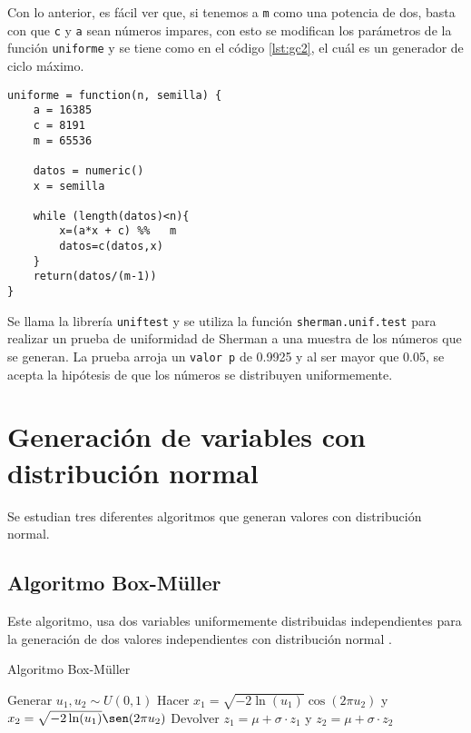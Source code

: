 \documentclass[12pt,letterpaper]{article}
\begin{document}
Con lo anterior, es fácil ver que, si tenemos a \texttt{m} como una potencia de dos, basta con que \texttt{c} y \texttt{a} sean números impares, con esto se modifican los parámetros de la función \texttt{uniforme} y se tiene como en el código \ref{lst:gc2}, el cuál es un generador de ciclo máximo.
\begin{lstlisting}[label=lst:gc2,caption=Generador congruencial., frame = single]
uniforme = function(n, semilla) {
    a = 16385
    c = 8191
    m = 65536
    
    datos = numeric()
    x = semilla
    
    while (length(datos)<n){
        x=(a*x + c) %%   m
        datos=c(datos,x)
    }
    return(datos/(m-1))
}
\end{lstlisting} 

Se llama la librería \texttt{uniftest} y se utiliza la función \texttt{sherman.unif.test} para realizar un prueba de uniformidad de Sherman a una muestra de los números que se generan. La prueba arroja un \texttt{valor p} de 0.9925 y al ser mayor que 0.05, se acepta la hipótesis de que los números se distribuyen uniformemente.



\section{Generación de variables con distribución normal}
Se estudian tres diferentes algoritmos que generan valores con distribución normal.
\subsection{Algoritmo Box-Müller}
Este algoritmo, usa dos variables uniformemente distribuidas independientes para la generación de dos valores independientes con distribución normal \cite{int}. 

\begin{algorithm}
  \caption{Algoritmo Box-Müller}
  \begin{algorithmic}[1]
    \Require{$\mu, \sigma$} 
 
    \State Generar  $u_1, u_2 \sim U(0,1)$ 
    \State Hacer $x_1=\sqrt{-2\ln(u_1)}\cos( 2\pi u_2)$ y $x_2=\sqrt{-2\ln(u_1)}\sen( 2\pi u_2)$
    \State Devolver $z_1=\mu + \sigma \cdot z_1$ y $z_2=\mu + \sigma \cdot z_2$
 
  \end{algorithmic}
\end{algorithm}
\end{document}
